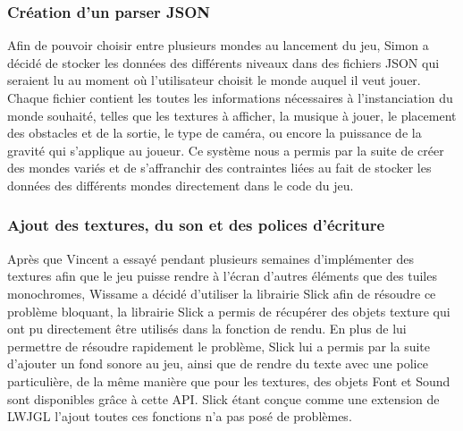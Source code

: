 \subsubsection{Création d'un parser JSON}
Afin de pouvoir choisir entre plusieurs mondes au lancement du jeu, Simon a décidé de stocker les données des différents niveaux dans des fichiers JSON qui seraient lu au moment où l'utilisateur choisit le monde auquel il veut jouer.
\ml
Chaque fichier contient les toutes les informations nécessaires à l'instanciation du monde souhaité, telles que les textures à afficher, la musique à jouer, le placement des obstacles et de la sortie, le type de caméra, ou encore la puissance de la gravité qui s'applique au joueur.
\ml
Ce système nous a permis par la suite de créer des mondes variés et de s'affranchir des contraintes liées au fait de stocker les données des différents mondes directement dans le code du jeu.

\subsubsection{Ajout des textures, du son et des polices d'écriture}

Après que Vincent a essayé pendant plusieurs semaines d'implémenter des textures afin que le jeu puisse rendre à l'écran d'autres éléments que des tuiles monochromes, Wissame a décidé d'utiliser la librairie Slick afin de résoudre ce problème bloquant, la librairie Slick a permis de récupérer des objets texture qui ont pu directement être utilisés dans la fonction de rendu.
\ml
En plus de lui permettre de résoudre rapidement le problème, Slick lui a permis par la suite d'ajouter un fond sonore au jeu, ainsi que de rendre du texte avec une police particulière, de la même manière que pour les textures, des objets Font et Sound sont disponibles grâce à cette API.
\ml
Slick étant conçue comme une extension de LWJGL l'ajout toutes ces fonctions n'a pas posé de problèmes.